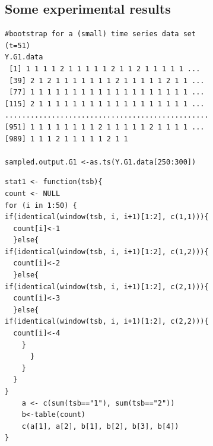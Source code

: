 \documentclass[
paper=128mm:96mm, %
fontsize=11pt, %
pagesize, %
parskip=half-, %
]{scrartcl} %
\theoremstyle{mythmstyle} %
\begin{document}
\clearpage
\subsection{Some experimental results}
\tiny 
\begin{multicols}{2}
\begin{verbatim}
#bootstrap for a (small) time series data set
(t=51)
Y.G1.data
 [1] 1 1 1 1 2 1 1 1 1 1 2 1 1 2 1 1 1 1 1 ...
 [39] 2 1 2 1 1 1 1 1 1 1 2 1 1 1 1 1 2 1 1 ...
 [77] 1 1 1 1 1 1 1 1 1 1 1 1 1 1 1 1 1 1 1 ...
[115] 2 1 1 1 1 1 1 1 1 1 1 1 1 1 1 1 1 1 1 ...
................................................
[951] 1 1 1 1 1 1 1 1 2 1 1 1 1 1 2 1 1 1 1 ...
[989] 1 1 1 2 1 1 1 1 1 2 1 1

sampled.output.G1 <-as.ts(Y.G1.data[250:300])
\end{verbatim}
\vfill
\columnbreak
\begin{verbatim}
stat1 <- function(tsb){
count <- NULL
for (i in 1:50) {
if(identical(window(tsb, i, i+1)[1:2], c(1,1))){
  count[i]<-1
  }else{
if(identical(window(tsb, i, i+1)[1:2], c(1,2))){
  count[i]<-2
  }else{
if(identical(window(tsb, i, i+1)[1:2], c(2,1))){
  count[i]<-3
  }else{
if(identical(window(tsb, i, i+1)[1:2], c(2,2))){
  count[i]<-4
	}
      }
    }
  }
}
	a <- c(sum(tsb=="1"), sum(tsb=="2"))
	b<-table(count)
	c(a[1], a[2], b[1], b[2], b[3], b[4])
}
\end{verbatim}
\end{multicols}

\clearpage
\end{document}
